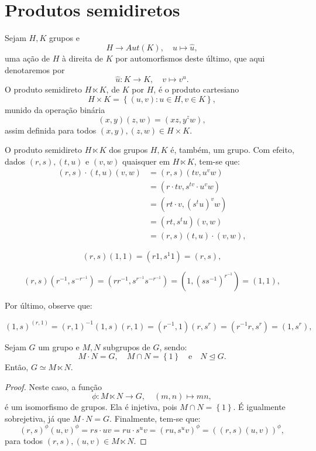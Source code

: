 \section{Produtos semidiretos}\label{sec:produtos-semidiretos}

\begin{definition}
  Sejam $H,K$ grupos e
  \[
    H\to{Aut(K)},\quad{u\mapsto\widehat{u}},
  \]
  uma ação de $H$ à direita de $K$ por automorfismos deste último, que aqui denotaremos por
  \[
    \widehat{u}:K\to{K},\quad{v\mapsto{v^{u}}}.
  \]
  O produto semidireto $H\ltimes{K}$, de $K$ por $H$, é o produto cartesiano
  \[
    H\times{K}
    =
    \left\{
      (u,v)
      :
      u\in{H},v\in{K}
      \right\},
  \]
  munido da operação binária
  \[
    (x,y)(z,w)=(xz,y^{z}w),
  \]
  assim definida para todos $(x,y),(z,w)\in{H\times{K}}$.
\end{definition}

O produto semidireto $H\ltimes{K}$ dos grupos $H,K$ é, também, um grupo. Com efeito, dados $(r,s),(t,u)$ e $(v,w)$ quaisquer em $H\ltimes{K}$, tem-se que:
\begin{align*}
  (r,s)\cdot{(t,u)(v,w)}
  &=(r,s)(tv,u^{v}w)                 \\
  &=(r\cdot{tv},s^{tv}\cdot{u^{v}w}) \\
  &=(rt\cdot{v},(s^{t}u)^{v}w)       \\
  &=(rt,s^{t}u)(v,w)                 \\
  &=(r,s)(t,u)\cdot{(v,w)},
\end{align*}

\[
  (r,s)(1,1)=(r1,s^{1}1)=(r,s),
\]

\[
  (r,s)(r^{-1},s^{-r^{-1}})=(rr^{-1},s^{r^{-1}}s^{-r^{-1}})=(1,(ss^{-1})^{r^{-1}})=(1,1),
\]

Por último, observe que:

\[
  (1,s)^{(r,1)}=(r,1)^{-1}(1,s)(r,1)=(r^{-1},1)(r,s^{r})=(r^{-1}r,s^{r})=(1,s^{r}),
\]

\begin{proposition}
  Sejam $G$ um grupo e $M,N$ subgrupos de $G$, sendo:
  \[
    M\cdot{N}=G,
    \quad
    M\cap{N}=\left\{1\right\}
    \quad\text{e}\quad
    N\unlhd{G}.
  \]
  Então, $G\simeq{M\ltimes{N}}$.
\end{proposition}

\begin{proof}
  Neste caso, a função
  \[
    \phi:M\ltimes{N}\to{G},\quad{(m,n)\mapsto{mn}},
  \]
  é um isomorfismo de grupos. Ela é injetiva, pois $M\cap{N}=\left\{1\right\}$. É igualmente sobrejetiva, já que $M\cdot{N}=G$. Finalmente, tem-se que:
  \[
    (r,s)^{\phi}(u,v)^{\phi}=rs\cdot{uv}=ru\cdot{s^{u}v}=(ru,s^{u}v)^{\phi}=\left((r,s)(u,v)\right)^{\phi},
  \]
  para todos $(r,s),(u,v)\in{M\ltimes{N}}$.
\end{proof}

